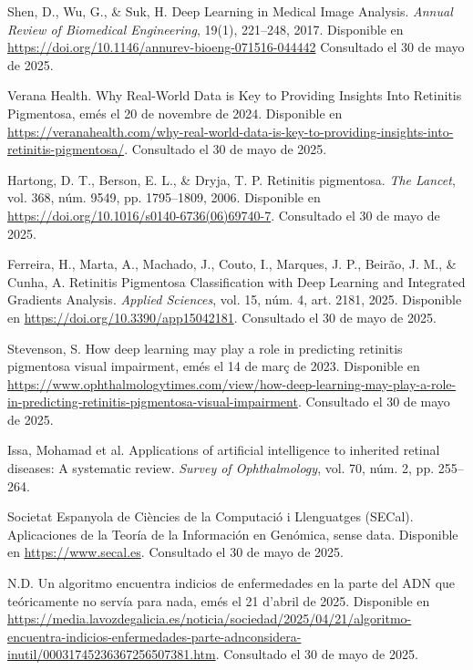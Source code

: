 \documentclass[11pt,spanish,listoffigures,listoftables]{tfgetsinf}
\begin{document}
\begin{thebibliography}{99}
   Shen, D., Wu, G., \& Suk, H.
   \newblock Deep Learning in Medical Image Analysis.
   \newblock \textit{Annual Review of Biomedical Engineering}, 19(1), 221--248, 2017.
   \newblock Disponible en
   \newblock \url{https://doi.org/10.1146/annurev-bioeng-071516-044442}
   \newblock Consultado el 30 de mayo de 2025.

   Verana Health.  
   \newblock Why Real-World Data is Key to Providing Insights Into Retinitis Pigmentosa,  
   emés el 20 de novembre de 2024.  
   \newblock Disponible en  
   \url{https://veranahealth.com/why-real-world-data-is-key-to-providing-insights-into-retinitis-pigmentosa/}.
   \newblock Consultado el 30 de mayo de 2025.

   Hartong, D. T., Berson, E. L., \& Dryja, T. P.  
   \newblock Retinitis pigmentosa.  
   \newblock \textit{The Lancet}, vol. 368, núm. 9549, pp. 1795--1809, 2006.  
   \newblock Disponible en  
   \url{https://doi.org/10.1016/s0140-6736(06)69740-7}.
   \newblock Consultado el 30 de mayo de 2025.

   Ferreira, H., Marta, A., Machado, J., Couto, I., Marques, J. P., Beirão, J. M., \& Cunha, A.  
   \newblock Retinitis Pigmentosa Classification with Deep Learning and Integrated Gradients Analysis.  
   \newblock \textit{Applied Sciences}, vol. 15, núm. 4, art. 2181, 2025.  
   \newblock Disponible en  
   \url{https://doi.org/10.3390/app15042181}.
   \newblock Consultado el 30 de mayo de 2025.

   Stevenson, S.  
   \newblock How deep learning may play a role in predicting retinitis pigmentosa visual impairment,  
   emés el 14 de març de 2023.  
   \newblock Disponible en  
   \url{https://www.ophthalmologytimes.com/view/how-deep-learning-may-play-a-role-in-predicting-retinitis-pigmentosa-visual-impairment}.
   \newblock Consultado el 30 de mayo de 2025.

   Issa, Mohamad et al.  
   \newblock Applications of artificial intelligence to inherited retinal diseases: A systematic review.  
   \newblock \textit{Survey of Ophthalmology}, vol. 70, núm. 2, pp. 255--264.  

   Societat Espanyola de Ciències de la Computació i Llenguatges (SECal).  
   \newblock Aplicaciones de la Teoría de la Información en Genómica,  
   sense data.  
   \newblock Disponible en  
   \url{https://www.secal.es}.
   \newblock Consultado el 30 de mayo de 2025.

   N.D.  
   \newblock Un algoritmo encuentra indicios de enfermedades en la parte del ADN que teóricamente no servía para nada,  
   emés el 21 d’abril de 2025.  
   \newblock Disponible en  
   \url{https://media.lavozdegalicia.es/noticia/sociedad/2025/04/21/algoritmo-encuentra-indicios-enfermedades-parte-adnconsidera-inutil/00031745236367256507381.htm}.
   \newblock Consultado el 30 de mayo de 2025.


\end{thebibliography}
\end{document}
